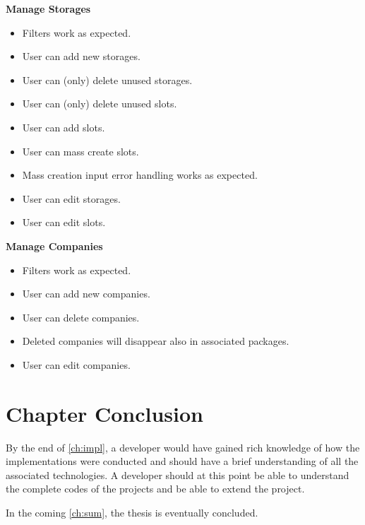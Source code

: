\noindent
\textbf{Manage Storages}
\begin{itemize}
    \item Filters work as expected.
    \item User can add new storages.
    \item User can (only) delete unused storages.
    \item User can (only) delete unused slots.
    \item User can add slots.
    \item User can mass create slots.
    \item Mass creation input error handling works as expected.
    \item User can edit storages.
    \item User can edit slots.
\end{itemize}

\noindent
\textbf{Manage Companies}
\begin{itemize}
    \item Filters work as expected.
    \item User can add new companies.
    \item User can delete companies.
    \item Deleted companies will disappear also in associated packages.
    \item User can edit companies.
\end{itemize}



\section*{Chapter Conclusion}

By the end of \autoref{ch:impl}, a developer would have gained rich knowledge of how the implementations were conducted and should have a brief understanding of all the associated technologies. A developer should at this point be able to understand the complete codes of the projects and be able to extend the project. 

In the coming \autoref{ch:sum}, the thesis is eventually concluded.